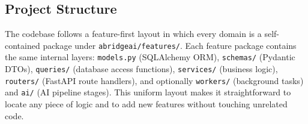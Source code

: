 \subsection{Project Structure}
\label{sec:impl_structure}

The codebase follows a feature-first layout in which every domain is a self-contained package under \texttt{abridgeai/features/}. Each feature package contains the same internal layers: \texttt{models.py} (SQLAlchemy ORM), \texttt{schemas/} (Pydantic DTOs), \texttt{queries/} (database access functions), \texttt{services/} (business logic), \texttt{routers/} (FastAPI route handlers), and optionally \texttt{workers/} (background tasks) and \texttt{ai/} (AI pipeline stages). This uniform layout makes it straightforward to locate any piece of logic and to add new features without touching unrelated code.

